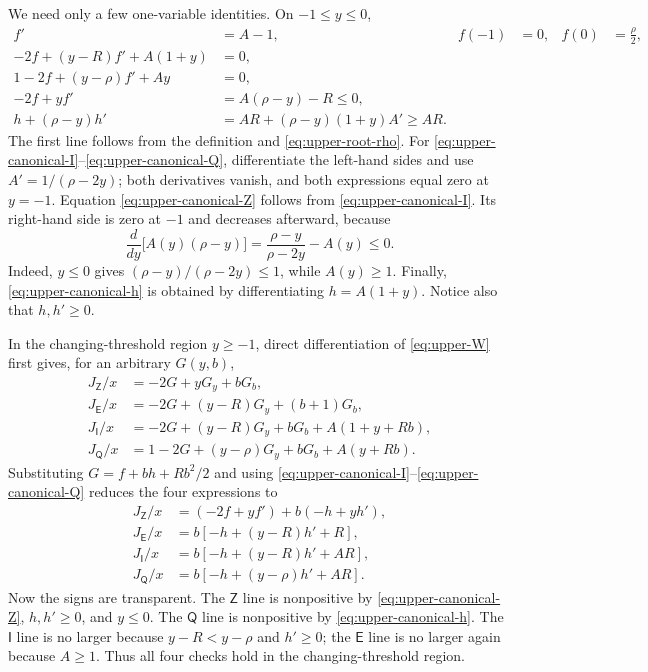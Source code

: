 We need only a few one-variable identities.  On $-1\le y\le0$,
\begin{align}
 f'&=A-1, & f(-1)&=0, & f(0)&=\frac\rho2,
                                                        \label{eq:upper-canonical-1}\\
 -2f+(y-R)f'+A(1+y)&=0,                 \label{eq:upper-canonical-I}\\
 1-2f+(y-\rho)f'+Ay&=0,                 \label{eq:upper-canonical-Q}\\
 -2f+yf'&=A(\rho-y)-R\le0,              \label{eq:upper-canonical-Z}\\
 h+(\rho-y)h'&=AR+(\rho-y)(1+y)A'\ge AR.
                                                        \label{eq:upper-canonical-h}
\end{align}
The first line follows from the definition and
\eqref{eq:upper-root-rho}.  For
\eqref{eq:upper-canonical-I}--\eqref{eq:upper-canonical-Q}, differentiate
the left-hand sides and use $A'=1/(\rho-2y)$; both derivatives vanish, and
both expressions equal zero at $y=-1$.  Equation
\eqref{eq:upper-canonical-Z} follows from
\eqref{eq:upper-canonical-I}.  Its right-hand side is zero at $-1$ and
decreases afterward, because
\[
 \frac{d}{dy}\bigl[A(y)(\rho-y)\bigr]
 =\frac{\rho-y}{\rho-2y}-A(y)\le0.
\]
Indeed, $y\le0$ gives $(\rho-y)/(\rho-2y)\le1$, while
$A(y)\ge1$.
Finally, \eqref{eq:upper-canonical-h} is obtained by differentiating
$h=A(1+y)$.  Notice also that $h,h'\ge0$.

In the changing-threshold region $y\ge-1$, direct differentiation of
\eqref{eq:upper-W} first gives, for an arbitrary $G(y,b)$,
\begin{align}
 J_{\mathsf Z}/x
   &=-2G+yG_y+bG_b,\label{eq:upper-drift-general-Z}\\
 J_{\mathsf E}/x
   &=-2G+(y-R)G_y+(b+1)G_b,\label{eq:upper-drift-general-E}\\
 J_{\mathsf I}/x
   &=-2G+(y-R)G_y+bG_b+A(1+y+Rb),
                                      \label{eq:upper-drift-general-I}\\
 J_{\mathsf Q}/x
   &=1-2G+(y-\rho)G_y+bG_b+A(y+Rb).
                                      \label{eq:upper-drift-general-Q}
\end{align}
Substituting $G=f+bh+Rb^2/2$ and using
\eqref{eq:upper-canonical-I}--\eqref{eq:upper-canonical-Q} reduces the
four expressions to
\begin{align}
 J_{\mathsf Z}/x
   &=(-2f+yf')+b(-h+yh'),\label{eq:upper-drift-active-Z}\\
 J_{\mathsf E}/x
   &=b[-h+(y-R)h'+R],\label{eq:upper-drift-active-E}\\
 J_{\mathsf I}/x
   &=b[-h+(y-R)h'+AR],\label{eq:upper-drift-active-I}\\
 J_{\mathsf Q}/x
   &=b[-h+(y-\rho)h'+AR].\label{eq:upper-drift-active-Q}
\end{align}
Now the signs are transparent.  The $\mathsf Z$ line is nonpositive by
\eqref{eq:upper-canonical-Z}, $h,h'\ge0$, and $y\le0$.  The $\mathsf Q$
line is nonpositive by \eqref{eq:upper-canonical-h}.  The
$\mathsf I$ line is no larger because $y-R<y-\rho$ and $h'\ge0$; the
$\mathsf E$ line is no larger again because $A\ge1$.  Thus all four checks
hold in the changing-threshold region.

